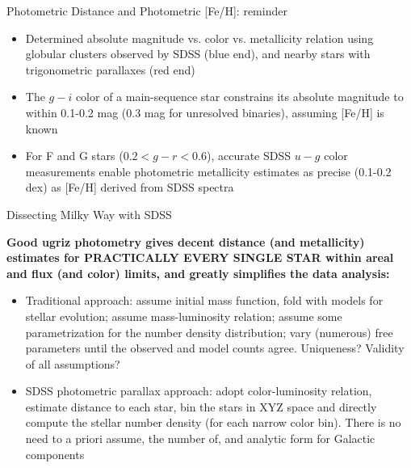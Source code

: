 \documentclass[letterpaper,landscape]{slides}
\begin{document}
\begin{slide}
{\begin{minipage}[t]{9cm}
\end{minipage}

\begin{minipage}[t]{13cm}
\begin{center}
\vskip -1in
{\large {\color{red} Photometric Distance and Photometric [Fe/H]}: reminder}
\end{center}

\begin{itemize}
\item
Determined absolute magnitude vs. color vs. metallicity relation
using globular clusters observed by SDSS (blue end), and nearby 
stars with trigonometric parallaxes (red end)
\item 
{\color{blue} The $g-i$ color of a main-sequence star constrains its
absolute magnitude to within 0.1-0.2 mag} (0.3 mag for unresolved
binaries), assuming [Fe/H] is known 
\item For F and G stars ($0.2<g-r<0.6$), accurate SDSS $u-g$ color
measurements enable {\color{blue} photometric metallicity estimates 
as precise (0.1-0.2 dex) as [Fe/H] derived from SDSS spectra} 
\end{itemize}     

\end{minipage}}
\vfill 
\end{slide}


\begin{slide}
\begin{center}
{\large \color{red}  Dissecting Milky Way with SDSS}
\end{center}

{\bf \color{blue} Good ugriz photometry gives decent distance (and metallicity)
estimates for PRACTICALLY EVERY SINGLE STAR within areal and flux 
(and color) limits, and greatly simplifies the data analysis:}

\begin{itemize}
\item
{\color{red} Traditional approach:} assume initial mass function, fold with 
models for stellar evolution; assume mass-luminosity relation;
assume some parametrization for the number density distribution;
vary (numerous) free parameters until the observed and model
counts agree. {\color{blue} Uniqueness? Validity of all
assumptions?} 
\item
{\color{red} SDSS photometric parallax  approach:} adopt color-luminosity
relation, estimate distance to each star, bin the stars in XYZ space
and directly compute the stellar number density (for each narrow color bin). 
{\color{blue} There is no need to a priori assume, the number of, and analytic form
for Galactic components}
\end{itemize}  

\vfill
\end{slide}
\end{document}
